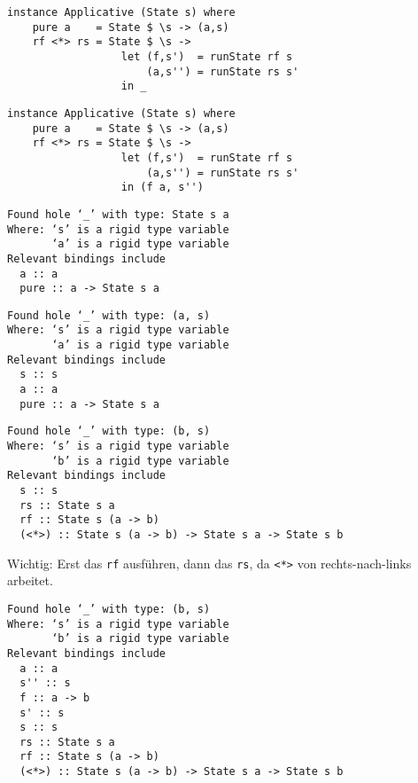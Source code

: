 \documentclass{beamer}
\begin{document}
\begin{frame}[fragile]
\begin{overprint}
\begin{verbatim}
\end{verbatim}
\begin{verbatim}
instance Applicative (State s) where
    pure a    = State $ \s -> (a,s)
    rf <*> rs = State $ \s ->
                  let (f,s')  = runState rf s
                      (a,s'') = runState rs s'
                  in _
\end{verbatim}
\begin{verbatim}
instance Applicative (State s) where
    pure a    = State $ \s -> (a,s)
    rf <*> rs = State $ \s ->
                  let (f,s')  = runState rf s
                      (a,s'') = runState rs s'
                  in (f a, s'')
\end{verbatim}
\end{overprint}
\bigskip
\scriptsize
\begin{overprint}
\begin{verbatim}
Found hole ‘_’ with type: State s a
Where: ‘s’ is a rigid type variable
       ‘a’ is a rigid type variable
Relevant bindings include
  a :: a
  pure :: a -> State s a
\end{verbatim}
\begin{verbatim}
Found hole ‘_’ with type: (a, s)
Where: ‘s’ is a rigid type variable
       ‘a’ is a rigid type variable
Relevant bindings include
  s :: s
  a :: a
  pure :: a -> State s a
\end{verbatim}
\begin{verbatim}
Found hole ‘_’ with type: (b, s)
Where: ‘s’ is a rigid type variable
       ‘b’ is a rigid type variable
Relevant bindings include
  s :: s
  rs :: State s a
  rf :: State s (a -> b)
  (<*>) :: State s (a -> b) -> State s a -> State s b
\end{verbatim}
\normalsize
Wichtig: Erst das \texttt{rf} ausführen, dann das \texttt{rs}, da \texttt{<*>} von rechts-nach-links arbeitet.
\scriptsize
\begin{verbatim}
Found hole ‘_’ with type: (b, s)
Where: ‘s’ is a rigid type variable
       ‘b’ is a rigid type variable
Relevant bindings include
  a :: a
  s'' :: s
  f :: a -> b
  s' :: s
  s :: s
  rs :: State s a
  rf :: State s (a -> b)
  (<*>) :: State s (a -> b) -> State s a -> State s b
\end{verbatim}
\end{overprint}
\end{frame}
\end{document}

